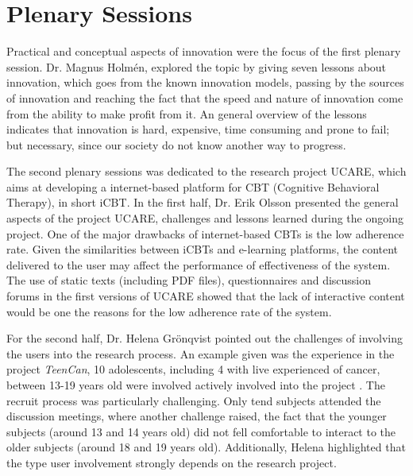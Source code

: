 \section{Plenary Sessions}


Practical and conceptual aspects of innovation were the focus of the first plenary session. 
Dr. Magnus Holm\'{e}n, explored the topic by giving seven lessons about innovation, which goes from the known innovation models, passing by the sources of innovation and reaching the fact that the speed and nature of innovation come from the ability to make profit from it. 
An general overview of the lessons indicates that innovation is hard, expensive, time consuming and prone to fail; but necessary, since our society do not know another way to progress.


The second plenary sessions was dedicated to the research project UCARE, which aims at developing a internet-based platform for CBT (Cognitive Behavioral Therapy), in short iCBT. 
In the first half, Dr. Erik Olsson presented the general aspects of the project UCARE, challenges and lessons learned during the ongoing project. 
One of the major drawbacks of internet-based CBTs is the low adherence rate. 
Given the similarities between iCBTs and e-learning platforms, the content delivered to the user may affect the performance of effectiveness of the system. 
The use of static texts (including PDF files), questionnaires and discussion forums in the first versions of UCARE showed that the lack of interactive content would be one the reasons for the low adherence rate of the system.

For the second half, Dr. Helena Grönqvist pointed out the challenges of involving the users into the research process. 
An example given was the experience in the project \textit{TeenCan}, 10 adolescents, including 4 with live experienced of cancer, between 13-19 years old were involved actively involved into the project . 
The recruit process was particularly challenging. 
Only tend subjects attended the discussion meetings, where another challenge raised, the fact that the younger subjects (around 13 and 14 years old) did not fell comfortable to interact to the older subjects (around 18 and 19 years old). 
Additionally, Helena highlighted that the type user involvement strongly depends on the research project.


